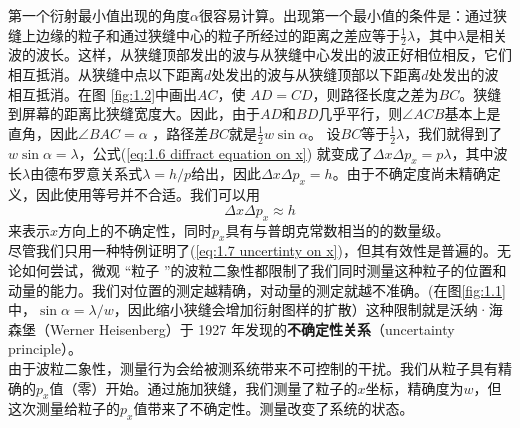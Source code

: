 	\indent 第一个衍射最小值出现的角度$\alpha$很容易计算。出现第一个最小值的条件是：通过狭缝上边缘的粒子和通过狭缝中心的粒子所经过的距离之差应等于$\frac{1}{2}\lambda$，其中$\lambda$是相关波的波长。这样，从狭缝顶部发出的波与从狭缝中心发出的波正好相位相反，它们相互抵消。从狭缝中点以下距离$d$处发出的波与从狭缝顶部以下距离$d$处发出的波相互抵消。在图 \ref{fig:1.2}中画出$AC$，使 $AD=CD$，则路径长度之差为$BC$。狭缝到屏幕的距离比狭缝宽度大。因此，由于$AD$和$BD$几乎平行，则$\angle ACB$基本上是直角，因此$\angle BAC = \alpha$ ，路径差$BC$就是$\frac{1}{2}w \sin \alpha$。 设$BC$等于$\frac{1}{2}\lambda$，我们就得到了$w\sin\alpha=\lambda$，公式(\ref{eq:1.6 diffract equation on x}) 就变成了$\Delta x \Delta p_x=p\lambda$，其中波长$\lambda$由德布罗意关系式$\lambda=h/p$给出，因此$\Delta x \Delta p_x=h$。由于不确定度尚未精确定义，因此使用等号并不合适。我们可以用 
	\begin{equation}
		\Delta x \Delta p_x \approx h
		\label{eq:1.7 uncertinty on x}
	\end{equation}
	来表示$x$方向上的不确定性，同时$p_x$具有与普朗克常数相当的的数量级。\\
	\indent 尽管我们只用一种特例证明了(\ref{eq:1.7 uncertinty on x})，但其有效性是普遍的。无论如何尝试，微观 “粒子 ”的波粒二象性都限制了我们同时测量这种粒子的位置和动量的能力。我们对位置的测定越精确，对动量的测定就越不准确。(在图\ref{fig:1.1}中，$\sin \alpha = \lambda / w$，因此缩小狭缝会增加衍射图样的扩散）这种限制就是沃纳·海森堡（Werner Heisenberg）于 1927 年发现的\textbf{不确定性关系}（uncertainty principle）。\\
	\indent 由于波粒二象性，测量行为会给被测系统带来不可控制的干扰。我们从粒子具有精确的$p_x$值（零）开始。通过施加狭缝，我们测量了粒子的$x$坐标，精确度为$w$，但这次测量给粒子的$p_x$值带来了不确定性。测量改变了系统的状态。
	
	
